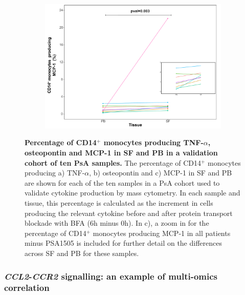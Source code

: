 \begin{figure}[H]
\begin{subfigure}[b]{0.45\textwidth}
\includegraphics[width=\textwidth]{./Results3/pdfs/CyTOF_validation_cohort_CCL2_percentage}
\caption{}
\end{subfigure}
\caption[Percentage of CD14$^+$ monocytes producing TNF-$\alpha$, osteopontin and MCP-1 in SF and PB in a validation cohort of ten PsA samples.]{\textbf{Percentage of CD14$^+$ monocytes producing TNF-$\alpha$, osteopontin and MCP-1 in SF and PB in a validation cohort of ten PsA samples.} The percentage of CD14$^+$ monocytes producing a) TNF-$\alpha$, b) osteopontin and c) MCP-1 in SF and PB are shown for each of the ten samples in a PsA cohort used to validate cytokine production by mass cytometry. In each sample and tissue, this percentage is calculated as the increment in cells producing the relevant cytokine before and after protein transport blockade with BFA (6h minus 0h). In c), a zoom in for the percentage of CD14$^+$ monocytes producing MCP-1 in all patients minus PSA1505 is included for further detail on the differences across SF and PB for these samples.}
\label{figure:CyTOF_cytokines_validation_cohort}
\end{figure}


\subsubsection{\textit{CCL2}-\textit{CCR2} signalling: an example of multi-omics correlation}


